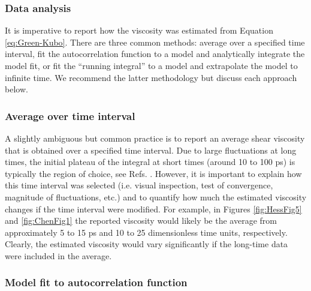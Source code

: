 \documentclass[9pt,bestpractices]{livecoms}
\begin{document}
\subsubsection{Data analysis} \label{sec:Viscosity:Green-Kubo: Data analysis}

It is imperative to report how the viscosity was estimated from Equation \ref{eq:Green-Kubo}. There are three common methods: average over a specified time interval, fit the autocorrelation function to a model and analytically integrate the model fit, or fit the ``running integral'' to a model and extrapolate the model to infinite time. We recommend the latter methodology but discuss each approach below.

\subsubsection*{Average over time interval}

A slightly ambiguous but common practice is to report an average shear viscosity that is obtained over a specified time interval. Due to large fluctuations at long times, the initial plateau of the integral at short times (around 10 to 100 ps) is typically the region of choice, see Refs. \cite{Fanourgakis2012,Chen2009}. However, it is important to explain how this time interval was selected (i.e. visual inspection, test of convergence, magnitude of fluctuations, etc.) and to quantify how much the estimated viscosity changes if the time interval were modified. For example, in Figures \ref{fig:HessFig5} and \ref{fig:ChenFig1} the reported viscosity would likely be the average from approximately 5 to 15 ps and 10 to 25 dimensionless time units, respectively. Clearly, the estimated viscosity would vary significantly if the long-time data were included in the average. 

\subsubsection*{Model fit to autocorrelation function}
\end{document}
